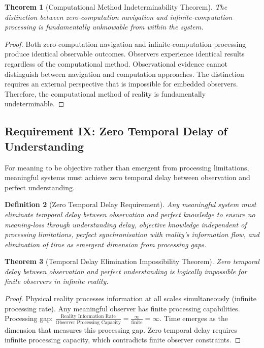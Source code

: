 \documentclass[12pt,a4paper]{article}
\newtheorem{theorem}{Theorem}[section]
\newtheorem{definition}[theorem]{Definition}
\begin{document}
\begin{theorem}[Computational Method Indeterminability Theorem]
The distinction between zero-computation navigation and infinite-computation processing is fundamentally unknowable from within the system.
\end{theorem}

\begin{proof}
Both zero-computation navigation and infinite-computation processing produce identical observable outcomes. Observers experience identical results regardless of the computational method. Observational evidence cannot distinguish between navigation and computation approaches. The distinction requires an external perspective that is impossible for embedded observers. Therefore, the computational method of reality is fundamentally undeterminable.
\end{proof}

\subsection{Requirement IX: Zero Temporal Delay of Understanding}

For meaning to be objective rather than emergent from processing limitations, meaningful systems must achieve zero temporal delay between observation and perfect understanding.

\begin{definition}[Zero Temporal Delay Requirement]
Any meaningful system must eliminate temporal delay between observation and perfect knowledge to ensure no meaning-loss through understanding delay, objective knowledge independent of processing limitations, perfect synchronisation with reality's information flow, and elimination of time as emergent dimension from processing gaps.
\end{definition}

\begin{theorem}[Temporal Delay Elimination Impossibility Theorem]
Zero temporal delay between observation and perfect understanding is logically impossible for finite observers in infinite reality.
\end{theorem}

\begin{proof}
Physical reality processes information at all scales simultaneously (infinite processing rate). Any meaningful observer has finite processing capabilities. Processing gap: $\frac{\text{Reality Information Rate}}{\text{Observer Processing Capacity}} = \frac{\infty}{\text{finite}} = \infty$. Time emerges as the dimension that measures this processing gap. Zero temporal delay requires infinite processing capacity, which contradicts finite observer constraints.
\end{proof}
\end{document}
